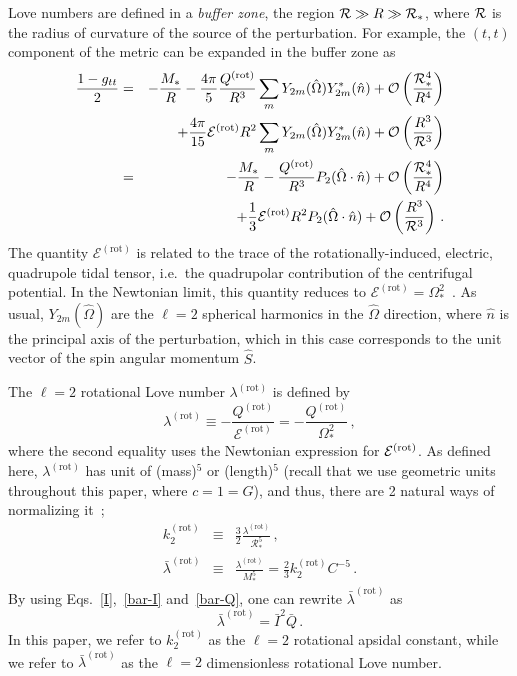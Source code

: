 \documentclass[aps,twocolumn,nofootinbib,showpacs,superscriptaddress,hyperref]{revtex4-1}
\newcommand\be{\begin{equation}}
\newcommand\ba{\begin{eqnarray}}
\newcommand\ee{\end{equation}}
\newcommand\ea{\end{eqnarray}}
\newcommand{\nn}{\nonumber}
\newcommand{\NS}{*}
\newcommand{\RNS}{\mathcal{R}_*}
\newcommand{\rot}{\mathrm{(rot)}}
\newcommand{\Ibar}{\bar{I}}
\newcommand{\Qbar}{\bar{Q}}
\begin{document}
Love numbers are defined in a {\emph{buffer zone}}, the region ${\cal{R}} \gg R \gg \RNS$, where ${\cal{R}}$ is the radius of curvature of the source of the perturbation. For example, the $(t,t)$ component of the metric can be expanded in the buffer zone as~\cite{mora-will,Yunes:2005nn,Yunes:2006iw,JohnsonMcDaniel:2009dq,hinderer-love,Chatziioannou:2012gq} 
%
\ba
\label{tidal-asymp}
\frac{1-g_{tt}}{2} &=& - \frac{M_\NS}{R} - \frac{4\pi}{5} \frac{Q^\rot}{R^3} \sum_m Y_{2m} ( \hat{\Omega} ) Y_{2m}^* ( \hat{n} ) + \mathcal{O} \left( \frac{\RNS^{4}}{R^4} \right) \nn \\
&& + \frac{4\pi}{15} \mathcal{E}^\rot R^2 \sum_m Y_{2m} ( \hat{\Omega} ) Y_{2m}^* (\hat{n} )  + \mathcal{O}\left(\frac{R^{3}}{{\cal{R}}^3}\right) \nn \\
&=& - \frac{M_\NS}{R} - \frac{Q^\rot}{R^3} P_2 (\hat{\Omega} \cdot \hat{n}) + \mathcal{O} \left( \frac{\RNS^{4}}{R^4} \right) \nn \\
&& + \frac{1}{3} \mathcal{E}^\rot R^2 P_2 (\hat{\Omega} \cdot \hat{n})  + \mathcal{O}\left(\frac{R^{3}}{{\cal{R}}^3}\right)\,.
\ea
%
The quantity $\mathcal{E}^\rot$ is related to the trace of the rotationally-induced, electric, quadrupole tidal tensor, i.e.~the quadrupolar contribution of the centrifugal potential. In the Newtonian limit, this quantity reduces to $\mathcal{E}^\rot = \Omega_\NS^2$~\cite{mora-will}. As usual, $Y_{2m} ( \hat{\Omega} )$ are the $\ell =2$ spherical harmonics in the $\hat{\Omega}$ direction, where $\hat{n}$ is the principal axis of the perturbation, which in this case corresponds to the unit vector of the spin angular momentum $\hat{S}$.

The $\ell=2$ rotational Love number $\lambda^\rot$ is defined by~\cite{mora-will,berti-iyer-will}
%
\be
\lambda^\rot \equiv - \frac{Q^\rot}{\mathcal{E}^\rot} = -\frac{Q^\rot}{\Omega_{\NS}^2}\,,
\ee
%
where the second equality uses the Newtonian expression for ${\cal{E}}^{\rot}$. As defined here, $\lambda^\rot$ has unit of (mass)$^5$ or (length)$^5$ (recall that we use geometric units throughout this paper, where $c=1=G$), and thus, there are 2 natural ways of normalizing it~\cite{mora-will,berti-iyer-will};
%
\ba
k_2^\rot & \equiv & \frac{3}{2} \frac{\lambda^\rot}{\RNS^5}\,,  \\
\bar{\lambda}^\rot &\equiv& \frac{\lambda^\rot}{M_\NS^5} = \frac{2}{3} k_2^\rot C^{-5}\,.
\ea
%
By using Eqs.~\eqref{I},~\eqref{bar-I} and~\eqref{bar-Q}, one can rewrite $\bar{\lambda}^\rot$ as
%
\be
\bar{\lambda}^\rot = \Ibar^2 \Qbar\,.
\ee
%
In this paper, we refer to $k_2^\rot$ as the $\ell=2$ rotational apsidal constant, while we refer to $\bar{\lambda}^\rot$ as the $\ell=2$ dimensionless rotational Love number.
\end{document}
